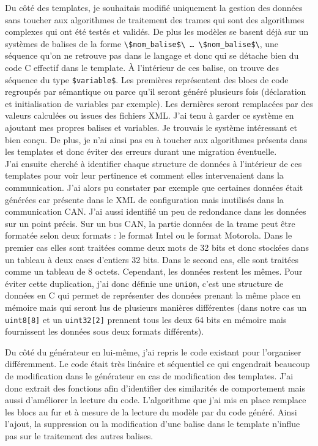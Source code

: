 Du côté des templates, je souhaitais modifié uniquement la gestion des données sans toucher aux algorithmes de traitement des trames qui sont des algorithmes complexes qui ont été testés et validés. De plus les modèles se basent déjà sur un systèmes de balises de la forme {\tt \textbackslash\$nom\_balise\$\textbackslash\- \ldots\- \textbackslash\$nom\_balise\$\textbackslash}, une séquence qu'on ne retrouve pas dans le langage et donc qui se détache bien du code C effectif dans le template. À l'intérieur de ces balise, on trouve des séquence du type {\tt \$variable\$}. Les premières représentent des blocs de code regroupés par sémantique ou parce qu'il seront généré plusieurs fois (déclaration et initialisation de variables par exemple). Les dernières seront remplacées par des valeurs calculées ou issues des fichiers XML. J'ai tenu à garder ce système en ajoutant mes propres balises et variables. Je trouvais le système intéressant et bien conçu. De plus, je n'ai ainsi pas eu à toucher aux algorithmes présents dans les templates et donc éviter des erreurs durant une migration éventuelle.\\
J'ai ensuite cherché à identifier chaque structure de données à l'intérieur de ces templates pour voir leur pertinence et comment elles intervenaient dans la communication. J'ai alors pu constater par exemple que certaines données était générées car présente dans le XML de configuration mais inutilisés dans la communication CAN. J'ai aussi identifié un peu de redondance dans les données sur un point précis. Sur un bus CAN, la partie données de la trame peut être formatée selon deux formats : le format Intel ou le format Motorola. Dans le premier cas elles sont traitées comme deux mots de 32 bits et donc stockées dans un tableau à deux cases d'entiers 32 bits. Dans le second cas, elle sont traitées comme un tableau de 8 octets. Cependant, les données restent les mêmes. Pour éviter cette duplication, j'ai donc définie une {\tt union}, c'est une structure de données en C qui permet de représenter des données prenant la même place en mémoire mais qui seront lus de plusieurs manières différentes (dans notre cas un {\tt uint8[8]} et un {\tt uint32[2]} prennent tous les deux 64 bits en mémoire mais fournissent les données sous deux formats différents).

Du côté du générateur en lui-même, j'ai repris le code existant pour l'organiser différemment. Le code était très linéaire et séquentiel ce qui engendrait beaucoup de modification dans le générateur en cas de modification des templates. J'ai donc extrait des fonctions afin d'identifier des similarités de comportement mais aussi d'améliorer la lecture du code. L'algorithme que j'ai mis en place remplace les blocs au fur et à mesure de la lecture du modèle par du code généré. Ainsi l'ajout, la suppression ou la modification d'une balise dans le template n'influe pas sur le traitement des autres balises.

